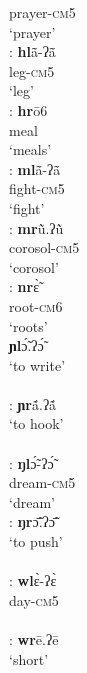 \documentclass[output=paper]{langscibook}
\begin{document}
\begin{exe}
\begin{multicols}{2}
\begin{xlisti}
            {}      prayer-\textsc{cm}5\\
            {}      `prayer'\\
        \ex \glll [hl]:   \textbf{hl}ã̄-ʔã̄\\
            {} leg-\textsc{cm}5\\
            {} `leg'\\
        \ex \glll [hr]:      \textbf{hr}ō6\\
                {}          meal\\
                {}          `meals'\\
        \ex \glll [ml]:      \textbf{ml}ã̄-ʔã̄ \\
            {}          fight-\textsc{cm}5\\
            {}          `fight'\\
        \ex \glll  [mr]:       \textbf{mr}ũ̀.ʔũ̀ \\
            {}  corosol-\textsc{cm}5\\
            {}  `corosol'\\
        \ex \glll [nr]:      \textbf{nr}ɛ̃̀\\
            {}          root-\textsc{cm}6\\
            {}          `roots'\\
        \ex \glll [ɲl] \textbf{ɲl}ɔ̃́.ʔɔ̃́\\
            {}  {`to write'}\\
            {} {} \\
        \ex \glll [ɲr]:      \textbf{ɲr}ã́.ʔã́ \\
            {}      {`to hook'}\\
            {} {} \\
        \ex \glll [ŋl]:       \textbf{ŋl}ɔ̃́-ʔɔ̃́\\
            {} dream-\textsc{cm}5\\
            {} `dream'\\
        \ex \glll [ŋr]:       \textbf{ŋr}ɔ̃̄.ʔɔ̃̄    \\
            {}  {`to push'}\\
            {} {} \\
        \ex  \glll [wl]:       \textbf{wl}ɛ̀-ʔɛ̀ \\
                {}          day-\textsc{cm}5\\
                {} {} \\
        \ex \glll [wr]:       \textbf{wr}ē.ʔē  \\
                {}          `short'\\

\end{xlisti}
\end{multicols}
\end{exe}
\end{document}

